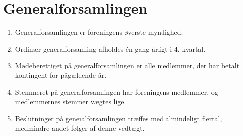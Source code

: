 \documentclass[a4paper, 10pt]{article}
\newenvironment{stykenum}{
  \begin{enumerate}[%
    label=Stk.~\arabic*:, ref=\textsection~\theenumi~Stk.~\arabic*, start=1]
}{\end{enumerate}}
\begin{document}
\section{Generalforsamlingen}
\begin{stykenum}
    \item Generalforsamlingen er foreningens øverste myndighed.

    \item Ordinær generalforsamling afholdes én gang årligt i 4. kvartal.

    \item Mødeberettiget på generalforsamlingen er alle medlemmer, der har
        betalt kontingent for pågældende år.

    \item Stemmeret på generalforsamlingen har foreningens medlemmer, og
        medlemmernes stemmer vægtes lige.

    \item Beslutninger på generalforsamlingen træffes med almindeligt flertal,
        medmindre andet følger af denne vedtægt.
\end{stykenum}
\end{document}
